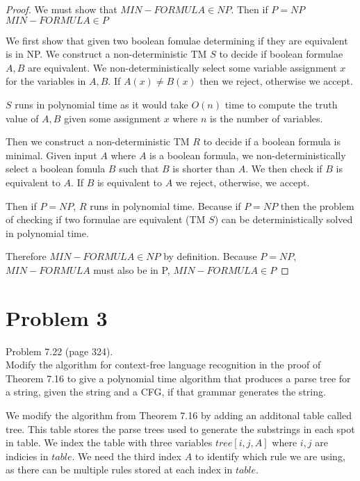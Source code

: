 \documentclass[11pt]{article}
\begin{document}
\begin{proof}


We must show that $MIN-FORMULA \in NP$. Then if $P = NP$ $MIN-FORMULA \in P$


We first show that given two boolean fomulae determining if they are equivalent is in NP. We construct a non-deterministic TM $S$ to decide if boolean formulae $A, B$ are equivalent. We non-deterministically select some variable assignment $x$ for the variables in $A, B$. If $A(x) \neq B(x)$ then we reject, otherwise we accept. 

$S$ runs in polynomial time as it would take $O(n)$ time to compute the truth value of $A, B$ given some assignment $x$ where $n$ is the number of variables. 



Then we construct a non-deterministic TM $R$ to decide if a boolean formula is minimal. Given input $A$ where $A$ is a boolean formula, we non-deterministically select a boolean fomula $B$ such that $B$ is shorter than $A$. We then check if $B$ is equivalent to $A$. If $B$ is equivalent to $A$ we reject, otherwise, we accept. 

Then if $P = NP$, $R$ runs in polynomial time. Because if $P = NP$ then the problem of checking if two formulae are equivalent (TM $S$) can be deterministically solved in polynomial time. 

Therefore $MIN-FORMULA \in NP$ by definition. Because $P = NP$, $MIN-FORMULA$ must also be in P, $MIN-FORMULA \in P$

\end{proof}


\newpage
\section*{Problem 3}

Problem 7.22 (page 324).\\
Modify the algorithm for context-free language recognition in the proof of Theorem 7.16 to give a polynomial time algorithm that produces a parse tree for a
string, given the string and a CFG, if that grammar generates the string.
\newline


We modify the algorithm from Theorem 7.16 by adding an additonal table called tree. This table stores the parse trees used to generate the substrings in each spot in table. We index the table with three variables $tree[i, j, A]$ where $i, j$ are indicies in $table$. We need the third index $A$ to identify which rule we are using, as there can be multiple rules stored at each index in $table$. 
\end{document}
